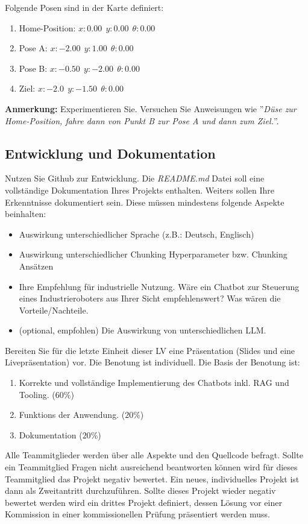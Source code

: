 \documentclass{article}
\begin{document}
Folgende Posen sind in der Karte definiert:

\begin{enumerate}
\item Home-Position: $x: 0.00 \ \  y: 0.00 \ \ \theta: 0.00$ 
\item Pose A: $x: -2.00 \ \  y: 1.00 \ \ \theta: 0.00$ 
\item Pose B: $x: -0.50 \ \  y: -2.00 \ \ \theta: 0.00$
\item Ziel: $x: -2.0 \ \  y: -1.50 \ \ \theta: 0.00$
\end{enumerate}

\textbf{Anmerkung:} Experimentieren Sie. Versuchen Sie Anweisungen wie ''\textit{Düse zur Home-Position, fahre dann von Punkt B zur Pose A und dann zum Ziel.}''. 

\subsection{Entwicklung und Dokumentation}
Nutzen Sie Github zur Entwicklung.
Die \textit{README.md} Datei soll eine vollständige Dokumentation Ihres Projekts enthalten.
Weiters sollen Ihre Erkenntnisse dokumentiert sein. 
Diese müssen mindestens folgende Aspekte beinhalten:
\begin{itemize}
    \item Auswirkung unterschiedlicher Sprache (z.B.: Deutsch, Englisch)
    \item Auswirkung unterschiedlicher Chunking Hyperparameter bzw. Chunking Ansätzen
    \item Ihre Empfehlung für industrielle Nutzung. Wäre ein Chatbot zur Steuerung eines Industrieroboters aus Ihrer Sicht empfehlenswert? Was wären die Vorteile/Nachteile.
    \item (optional, empfohlen) Die Auswirkung von unterschiedlichen LLM.
\end{itemize}

Bereiten Sie für die letzte Einheit dieser LV eine Präsentation (Slides und eine Livepräsentation) vor. 
Die Benotung ist individuell. 
Die Basis der Benotung ist:
\begin{enumerate}
    \item Korrekte und vollständige Implementierung des Chatbots inkl. RAG und Tooling. ($60\%$)
    \item Funktions der Anwendung. ($20\%$)
    \item Dokumentation ($20\%$)
\end{enumerate}
Alle Teammitglieder werden über alle Aspekte und den Quellcode befragt. 
Sollte ein Teammitglied Fragen nicht ausreichend beantworten können wird für dieses Teammitglied das Projekt negativ bewertet. 
Ein neues, individuelles Projekt ist dann als Zweitantritt durchzuführen.
Sollte dieses Projekt wieder negativ bewertet werden wird ein drittes Projekt definiert, dessen Lösung vor einer Kommission in einer kommissionellen Prüfung präsentiert werden muss.
\end{document}
